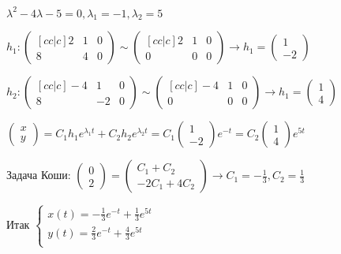 \documentclass[12pt]{article}
\begin{document}
    $\lambda^2 - 4\lambda - 5 = 0, \lambda_1 = -1, \lambda_2 = 5$

    $h_1: \begin{pmatrix}[cc|c] 2 & 1 & 0 \\ 8 & 4 & 0\end{pmatrix} \sim \begin{pmatrix}[cc|c] 2 & 1 & 0 \\ 0 & 0 & 0\end{pmatrix} \to
    h_1 = \begin{pmatrix}1 \\ -2\end{pmatrix}$

    $h_2: \begin{pmatrix}[cc|c] -4 & 1 & 0 \\ 8 & -2 & 0\end{pmatrix} \sim \begin{pmatrix}[cc|c] -4 & 1 & 0 \\ 0 & 0 & 0\end{pmatrix} \to
    h_1 = \begin{pmatrix}1 \\ 4\end{pmatrix}$

    $\begin{pmatrix}x \\ y\end{pmatrix} = C_1 h_1 e^{\lambda_1 t} + C_2 h_2 e^{\lambda_2 t} =
    C_1 \begin{pmatrix}1 \\ -2\end{pmatrix} e^{-t} = C_2 \begin{pmatrix}1 \\ 4\end{pmatrix} e^{5t}$

    Задача Коши: $\begin{pmatrix}0 \\ 2\end{pmatrix} = \begin{pmatrix}
                                                           C_1 + C_2 \\ -2C_1 + 4C_2
    \end{pmatrix} \to C_1 = -\frac{1}{3}, C_2 = \frac{1}{3}$

    Итак $\begin{cases}
              x(t) = -\frac{1}{3} e^{-t} + \frac{1}{3} e^{5t} \\
              y(t) = \frac{2}{3} e^{-t} + \frac{4}{3} e^{5t} \\
    \end{cases}$
\end{document}
